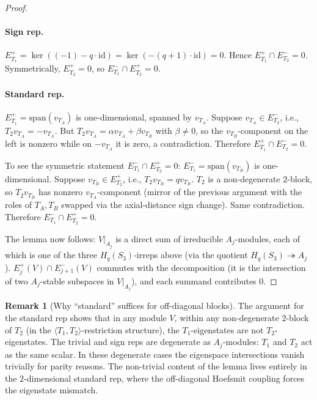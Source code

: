 \documentclass[11pt]{article}
\theoremstyle{definition}
\newtheorem{remark}[theorem]{Remark}
\begin{document}
\begin{proof}
\paragraph{Sign rep.} $E_{T_1}^+ = \ker((-1) - q\cdot\mathrm{id}) =
\ker(-(q+1)\cdot\mathrm{id}) = 0$.  Hence $E_{T_1}^+ \cap E_{T_2}^- = 0$.
Symmetrically, $E_{T_2}^+ = 0$, so $E_{T_1}^- \cap E_{T_2}^+ = 0$.

\paragraph{Standard rep.}  $E_{T_1}^+ = \mathrm{span}(v_{T_A})$ is
one-dimensional, spanned by $v_{T_A}$.  Suppose $v_{T_A} \in E_{T_2}^-$,
i.e., $T_2 v_{T_A} = -v_{T_A}$.  But $T_2 v_{T_A} = \alpha v_{T_A} +
\beta v_{T_B}$ with $\beta \ne 0$, so the $v_{T_B}$-component on the
left is nonzero while on $-v_{T_A}$ it is zero, a contradiction.
Therefore $E_{T_1}^+ \cap E_{T_2}^- = 0$.

To see the symmetric statement $E_{T_1}^- \cap E_{T_2}^+ = 0$:
$E_{T_1}^- = \mathrm{span}(v_{T_B})$ is one-dimensional.  Suppose
$v_{T_B} \in E_{T_2}^+$, i.e., $T_2 v_{T_B} = q v_{T_B}$.
$T_2$ is a non-degenerate $2$-block, so $T_2 v_{T_B}$ has nonzero
$v_{T_A}$-component (mirror of the previous argument with the
roles of $T_A, T_B$ swapped via the axial-distance sign change).
Same contradiction.  Therefore $E_{T_1}^- \cap E_{T_2}^+ = 0$.

\medskip

The lemma now follows: $V|_{A_j}$ is a direct sum of irreducible
$A_j$-modules, each of which is one of the three $H_q(S_3)$-irreps
above (via the quotient $H_q(S_3) \twoheadrightarrow A_j$).
$E_j^+(V) \cap E_{j+1}^-(V)$ commutes with the decomposition (it is
the intersection of two $A_j$-stable subspaces in $V|_{A_j}$), and
each summand contributes $0$.
\end{proof}

\begin{remark}[Why ``standard'' suffices for off-diagonal blocks]
The argument for the standard rep shows that in any module $V$,
within any non-degenerate $2$-block of $T_2$ (in the
$\langle T_1, T_2\rangle$-restriction structure), the
$T_1$-eigenstates are not $T_2$-eigenstates.  The trivial and sign
reps are degenerate as $A_j$-modules: $T_1$ and $T_2$ act as the
same scalar.  In these degenerate cases the eigenspace
intersections vanish trivially for parity reasons.  The non-trivial
content of the lemma lives entirely in the $2$-dimensional
standard rep, where the off-diagonal Hoefsmit coupling forces
the eigenstate mismatch.
\end{remark}
\end{document}
